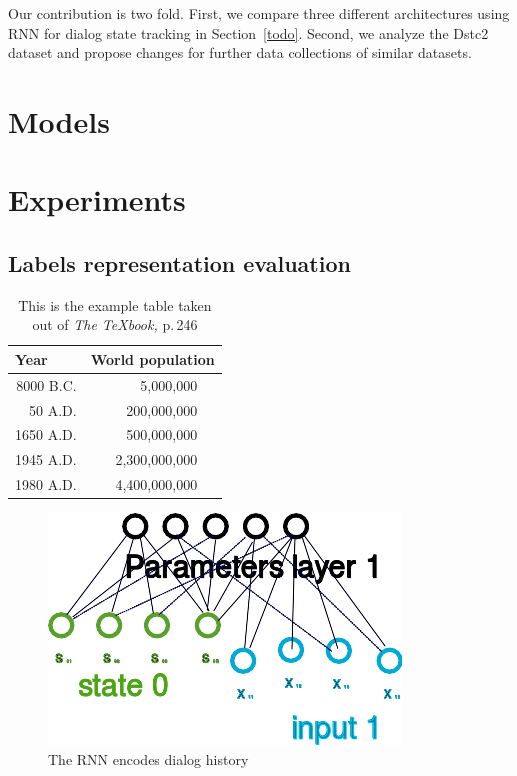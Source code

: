 \documentclass{itatnew}
\begin{document}
Our contribution is two fold. 
First, we compare three different architectures using RNN for dialog state tracking in Section~\ref{todo}.
Second, we analyze the Dstc2 dataset and propose changes for further data collections of similar datasets.


\section{Models}

\section{Experiments}

\subsection{Labels representation evaluation}

\begin{table}
\caption{This is the example table taken out of {\it The
\TeX{}book,} p.\,246}
\begin{center}
\begin{tabular}{r@{\quad}rl}
\hline
\multicolumn{1}{l}{\rule{0pt}{12pt}
                   Year}&\multicolumn{2}{l}{World population}\\[2pt]
\hline\rule{0pt}{12pt}
8000 B.C.  &     5,000,000& \\
  50 A.D.  &   200,000,000& \\
1650 A.D.  &   500,000,000& \\
1945 A.D.  & 2,300,000,000& \\
1980 A.D.  & 4,400,000,000& \\[2pt]
\hline
\end{tabular}
\end{center}
\end{table}


\begin{figure}
\includegraphics[width=\textwidth]{rnn}
\caption{The RNN encodes dialog history}
\end{figure}
\end{document}
